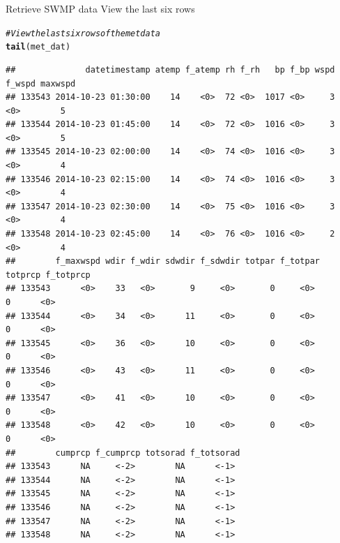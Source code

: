 \documentclass[xcolor=svgnames]{beamer}\usepackage[]{graphicx}\usepackage[]{color}
\makeatletter
\newcommand{\hlcom}[1]{\textcolor[rgb]{0.678,0.584,0.686}{\textit{#1}}}%
\newcommand{\hlstd}[1]{\textcolor[rgb]{0.345,0.345,0.345}{#1}}%
\newcommand{\hlkwd}[1]{\textcolor[rgb]{0.737,0.353,0.396}{\textbf{#1}}}%
\newenvironment{kframe}{%
 \def\at@end@of@kframe{}%
 \ifinner\ifhmode%
  \def\at@end@of@kframe{\end{minipage}}%
  \begin{minipage}{\columnwidth}%
 \fi\fi%
 \def\FrameCommand##1{\hskip\@totalleftmargin \hskip-\fboxsep
 \colorbox{shadecolor}{##1}\hskip-\fboxsep
     \hskip-\linewidth \hskip-\@totalleftmargin \hskip\columnwidth}%
 \MakeFramed {\advance\hsize-\width
   \@totalleftmargin\z@ \linewidth\hsize
   \@setminipage}}%
 {\par\unskip\endMakeFramed%
 \at@end@of@kframe}
\newenvironment{knitrout}{}{} %
\makeatother
\begin{document}
\begin{frame}{Retrieve SWMP data}
View the last six rows
\begin{knitrout}\scriptsize
{}\color{fgcolor}\begin{kframe}
\begin{alltt}
\hlcom{# View the last six rows of the met data}
\hlkwd{tail}\hlstd{(met_dat)}
\end{alltt}
\begin{verbatim}
##              datetimestamp atemp f_atemp rh f_rh   bp f_bp wspd f_wspd maxwspd
## 133543 2014-10-23 01:30:00    14    <0>  72 <0>  1017 <0>     3   <0>        5
## 133544 2014-10-23 01:45:00    14    <0>  72 <0>  1016 <0>     3   <0>        5
## 133545 2014-10-23 02:00:00    14    <0>  74 <0>  1016 <0>     3   <0>        4
## 133546 2014-10-23 02:15:00    14    <0>  74 <0>  1016 <0>     3   <0>        4
## 133547 2014-10-23 02:30:00    14    <0>  75 <0>  1016 <0>     3   <0>        4
## 133548 2014-10-23 02:45:00    14    <0>  76 <0>  1016 <0>     2   <0>        4
##        f_maxwspd wdir f_wdir sdwdir f_sdwdir totpar f_totpar totprcp f_totprcp
## 133543      <0>    33   <0>       9     <0>       0     <0>        0      <0> 
## 133544      <0>    34   <0>      11     <0>       0     <0>        0      <0> 
## 133545      <0>    36   <0>      10     <0>       0     <0>        0      <0> 
## 133546      <0>    43   <0>      11     <0>       0     <0>        0      <0> 
## 133547      <0>    41   <0>      10     <0>       0     <0>        0      <0> 
## 133548      <0>    42   <0>      10     <0>       0     <0>        0      <0> 
##        cumprcp f_cumprcp totsorad f_totsorad
## 133543      NA     <-2>        NA      <-1> 
## 133544      NA     <-2>        NA      <-1> 
## 133545      NA     <-2>        NA      <-1> 
## 133546      NA     <-2>        NA      <-1> 
## 133547      NA     <-2>        NA      <-1> 
## 133548      NA     <-2>        NA      <-1>
\end{verbatim}
\end{kframe}
\end{knitrout}
\end{frame}
\end{document}
